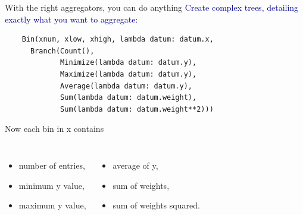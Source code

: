 \documentclass[aspectratio=169]{beamer}
\begin{document}
\begin{frame}[fragile]{With the right aggregators, you can do anything}
\vspace{0.75 cm}
\small
\textcolor{darkblue}{\normalsize Create complex trees, detailing exactly what you want to aggregate:}
\begin{verbatim}
    Bin(xnum, xlow, xhigh, lambda datum: datum.x,
      Branch(Count(),
             Minimize(lambda datum: datum.y),
             Maximize(lambda datum: datum.y),
             Average(lambda datum: datum.y),
             Sum(lambda datum: datum.weight),
             Sum(lambda datum: datum.weight**2)))
\end{verbatim}

\vspace{0.25 cm}
\begin{center}
\begin{minipage}{0.8\linewidth}
Now each bin in {\ttfamily\small x} contains
\begin{columns}
\begin{itemize}
\item number of entries,
\item minimum {\ttfamily\small y} value,
\item maximum {\ttfamily\small y} value,
\end{itemize}

\begin{itemize}
\item average of {\ttfamily\small y},
\item sum of weights,
\item sum of weights squared.
\end{itemize}
\end{columns}

\end{minipage}
\end{center}
\end{frame}
\end{document}
